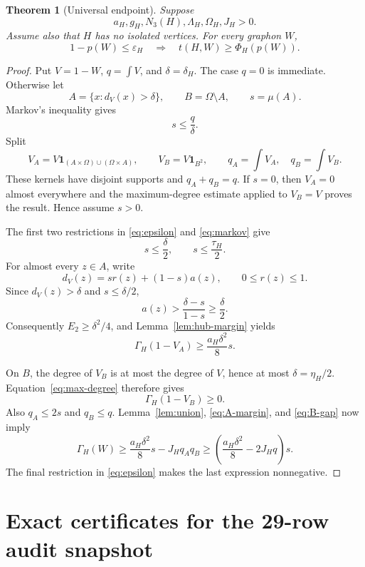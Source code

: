 \documentclass[11pt]{article}
\newtheorem{theorem}{Theorem}
\newcommand{\GammaH}{\Gamma_H}
\begin{document}
\begin{theorem}[Universal endpoint]
\label{thm:universal}
Suppose
\[
 a_H,g_H,N_3(H),\Lambda_H,\Omega_H,J_H>0.
\]
Assume also that $H$ has no isolated vertices.  For every graphon $W$,
\[
 1-p(W)\leq\varepsilon_H
 \quad\Longrightarrow\quad
 t(H,W)\geq\Phi_H(p(W)).
\]
\end{theorem}

\begin{proof}
Put $V=1-W$, $q=\int V$, and $\delta=\delta_H$.  The case $q=0$ is
immediate.  Otherwise let
\[
 A=\{x:d_V(x)>\delta\},
 \qquad B=\Omega\setminus A,
 \qquad s=\mu(A).
\]
Markov's inequality gives
\begin{equation}
 s\leq\frac q\delta.
 \label{eq:markov}
\end{equation}
Split
\[
 V_A=V\mathbf1_{(A\times\Omega)\cup(\Omega\times A)},
 \qquad
 V_B=V\mathbf1_{B^2},
 \qquad q_A=\int V_A,\quad q_B=\int V_B.
\]
These kernels have disjoint supports and $q_A+q_B=q$.
If $s=0$, then $V_A=0$ almost everywhere and the maximum-degree estimate
applied to $V_B=V$ proves the result.  Hence assume $s>0$.

The first two restrictions in \eqref{eq:epsilon} and \eqref{eq:markov} give
\[
 s\leq\frac\delta2,
 \qquad
 s\leq\frac{\tau_H}{2}.
\]
For almost every $z\in A$, write
\[
 d_V(z)=s r(z)+(1-s)a(z),
 \qquad 0\leq r(z)\leq1.
\]
Since $d_V(z)>\delta$ and $s\leq\delta/2$,
\[
 a(z)>\frac{\delta-s}{1-s}\geq\frac\delta2.
\]
Consequently $E_2\geq\delta^2/4$, and
Lemma~\ref{lem:hub-margin} yields
\begin{equation}
 \GammaH(1-V_A)\geq\frac{a_H\delta^2}{8}s.
 \label{eq:A-margin}
\end{equation}

On $B$, the degree of $V_B$ is at most the degree of $V$, hence at most
$\delta=\eta_H/2$.  Equation~\eqref{eq:max-degree} therefore gives
\begin{equation}
 \GammaH(1-V_B)\geq0.
 \label{eq:B-gap}
\end{equation}
Also $q_A\leq2s$ and $q_B\leq q$.  Lemma~\ref{lem:union},
\eqref{eq:A-margin}, and \eqref{eq:B-gap} now imply
\[
 \GammaH(W)
 \geq \frac{a_H\delta^2}{8}s-J_Hq_Aq_B
 \geq \left(\frac{a_H\delta^2}{8}-2J_Hq\right)s.
\]
The final restriction in \eqref{eq:epsilon} makes the last expression
nonnegative.
\end{proof}

\section{Exact certificates for the 29-row audit snapshot}
\end{document}
